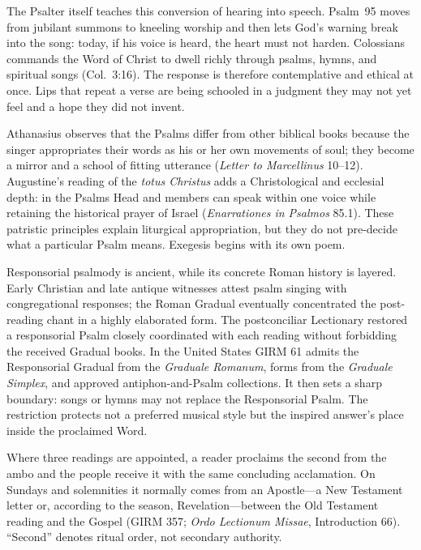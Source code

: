The Psalter itself teaches this conversion of hearing into speech. Psalm~95 moves from jubilant summons to kneeling worship and then lets God's warning break into the song: today, if his voice is heard, the heart must not harden. Colossians commands the Word of Christ to dwell richly through psalms, hymns, and spiritual songs (Col.~3:16). The response is therefore contemplative and ethical at once. Lips that repeat a verse are being schooled in a judgment they may not yet feel and a hope they did not invent.

Athanasius observes that the Psalms differ from other biblical books because the singer appropriates their words as his or her own movements of soul; they become a mirror and a school of fitting utterance (\emph{Letter to Marcellinus} 10--12). Augustine's reading of the \emph{totus Christus} adds a Christological and ecclesial depth: in the Psalms Head and members can speak within one voice while retaining the historical prayer of Israel (\emph{Enarrationes in Psalmos} 85.1). These patristic principles explain liturgical appropriation, but they do not pre-decide what a particular Psalm means. Exegesis begins with its own poem.

Responsorial psalmody is ancient, while its concrete Roman history is layered. Early Christian and late antique witnesses attest psalm singing with congregational responses; the Roman Gradual eventually concentrated the post-reading chant in a highly elaborated form. The postconciliar Lectionary restored a responsorial Psalm closely coordinated with each reading without forbidding the received Gradual books. In the United States GIRM 61 admits the Responsorial Gradual from the \emph{Graduale Romanum}, forms from the \emph{Graduale Simplex}, and approved antiphon-and-Psalm collections. It then sets a sharp boundary: songs or hymns may not replace the Responsorial Psalm. The restriction protects not a preferred musical style but the inspired answer's place inside the proclaimed Word.


Where three readings are appointed, a reader proclaims the second from the ambo and the people receive it with the same concluding acclamation. On Sundays and solemnities it normally comes from an Apostle---a New Testament letter or, according to the season, Revelation---between the Old Testament reading and the Gospel (GIRM 357; \emph{Ordo Lectionum Missae}, Introduction 66). ``Second'' denotes ritual order, not secondary authority.

